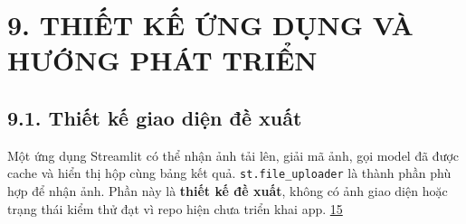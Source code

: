 \documentclass[
  vietnamese,
  12pt,
  a4paper,
]{article}
\begin{document}
\section{9. THIẾT KẾ ỨNG DỤNG VÀ HƯỚNG PHÁT
TRIỂN}\label{thiux1ebft-kux1ebf-ux1ee9ng-dux1ee5ng-vuxe0-hux1b0ux1edbng-phuxe1t-triux1ec3n}

\subsection{9.1. Thiết kế giao diện đề
xuất}\label{thiux1ebft-kux1ebf-giao-diux1ec7n-ux111ux1ec1-xuux1ea5t}

Một ứng dụng Streamlit có thể nhận ảnh tải lên, giải mã ảnh, gọi model
đã được cache và hiển thị hộp cùng bảng kết quả.
\texttt{s\allowbreak{}t\allowbreak{}.\allowbreak{}f\allowbreak{}i\allowbreak{}l\allowbreak{}e\allowbreak{}\_\allowbreak{}u\allowbreak{}p\allowbreak{}l\allowbreak{}o\allowbreak{}a\allowbreak{}d\allowbreak{}e\allowbreak{}r\allowbreak{}}
là thành phần phù hợp để nhận ảnh. Phần này là \textbf{thiết kế đề
xuất}, không có ảnh giao diện hoặc trạng thái kiểm thử đạt vì repo hiện
chưa triển khai app.
\href{https://docs.streamlit.io/develop/api-reference/widgets/st.file_uploader}{15}

\begin{center}
\end{center}

\begingroup\small\setlength{\tabcolsep}{4pt}\renewcommand{\arraystretch}{1.12}
\end{document}
